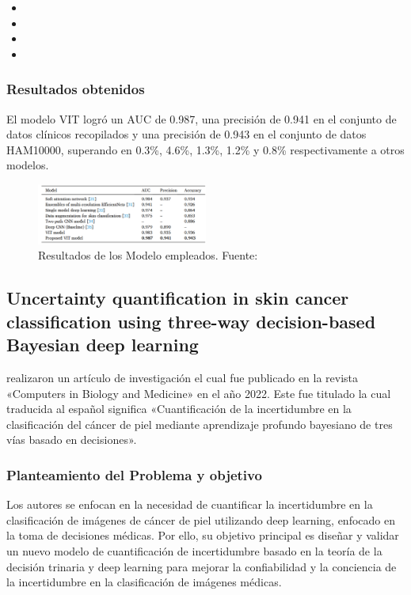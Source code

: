 \begin{itemize}
	\item \TPACone
	\item \TPACtwo
	\item \TPACthree
	\item \TPACfour
	
\end{itemize}


\subsubsection{Resultados obtenidos}
El modelo VIT logró un AUC de 0.987, una precisión de 0.941 en el conjunto de datos clínicos recopilados y una precisión de 0.943 en el conjunto de datos HAM10000, superando en 0.3\%, 4.6\%, 1.3\%, 1.2\% y 0.8\% respectivamente a otros modelos.

\begin{figure}[h]
	\begin{center}
		\includegraphics[width=0.5\textwidth]{2/figuras/An_improved_transformer_network _imagen_01.png}
		\caption{Resultados de los Modelo empleados. Fuente: \cite{xin2022improved}}
		\label{1:fig}
	\end{center}
\end{figure}




\subsection{Uncertainty quantification in skin cancer classification using three-way decision-based Bayesian deep learning \citep*{abdar2021uncertainty}}
\citeauthor{abdar2021uncertainty} realizaron un artículo de investigación el cual fue publicado en la revista «Computers in Biology and Medicine» en el año 2022. Este fue titulado  la cual traducida al español significa «Cuantificación de la incertidumbre en la clasificación del cáncer de piel mediante aprendizaje profundo bayesiano de tres vías basado en decisiones».
\subsubsection{Planteamiento del Problema y objetivo}
Los autores se enfocan en la necesidad de cuantificar la incertidumbre en la clasificación de imágenes de cáncer de piel utilizando deep learning, enfocado en la toma de decisiones médicas. Por ello, su objetivo principal es diseñar y validar un nuevo modelo de cuantificación de incertidumbre basado en la teoría de la decisión trinaria y deep learning  para mejorar la confiabilidad y la conciencia de la incertidumbre en la clasificación de imágenes médicas.

